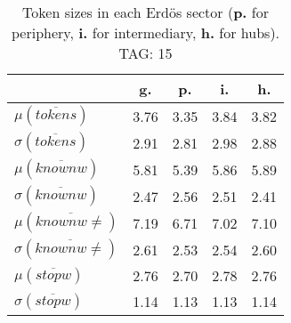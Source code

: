 \begin{table}[h!]
\begin{center}
\begin{tabular}{| l || c | c | c | c |}\hline
 & {\bf g.} & {\bf p.} & {\bf i.} & {\bf h.} \\\hline\hline
$\mu(\overline{tokens})$ & 3.76  & 3.35  & 3.84  & 3.82 \\
$\sigma(\overline{tokens})$ & 2.91  & 2.81  & 2.98  & 2.88 \\\hline
$\mu(\overline{knownw})$ & 5.81  & 5.39  & 5.86  & 5.89 \\
$\sigma(\overline{knownw})$ & 2.47  & 2.56  & 2.51  & 2.41 \\\hline
$\mu(\overline{knownw \neq})$ & 7.19  & 6.71  & 7.02  & 7.10 \\
$\sigma(\overline{knownw \neq})$ & 2.61  & 2.53  & 2.54  & 2.60 \\\hline
$\mu(\overline{stopw})$ & 2.76  & 2.70  & 2.78  & 2.76 \\
$\sigma(\overline{stopw})$ & 1.14  & 1.13  & 1.13  & 1.14 \\\hline
\end{tabular}
\caption{Token sizes in each Erd\"os sector ({{\bf p.}} for periphery, {{\bf i.}} for intermediary, {{\bf h.}} for hubs). TAG: 15}
\end{center}
\end{table}
